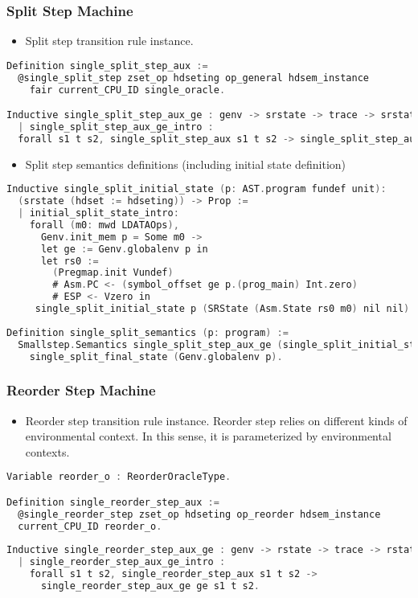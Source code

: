 \subsubsection{Split Step Machine}
\begin{itemize}[leftmargin=*]
\item Split step transition rule instance.
\end{itemize}
\begin{lstlisting}[language=C]
Definition single_split_step_aux :=
  @single_split_step zset_op hdseting op_general hdsem_instance 
    fair current_CPU_ID single_oracle.

Inductive single_split_step_aux_ge : genv -> srstate -> trace -> srstate -> Prop :=
  | single_split_step_aux_ge_intro : 
  forall s1 t s2, single_split_step_aux s1 t s2 -> single_split_step_aux_ge ge s1 t s2.
\end{lstlisting}


\begin{itemize}[leftmargin=*]
\item Split step semantics definitions (including initial state definition)
\end{itemize}
\begin{lstlisting}[language=C]
Inductive single_split_initial_state (p: AST.program fundef unit): 
  (srstate (hdset := hdseting)) -> Prop :=
  | initial_split_state_intro: 
    forall (m0: mwd LDATAOps),
      Genv.init_mem p = Some m0 ->
      let ge := Genv.globalenv p in
      let rs0 :=
        (Pregmap.init Vundef)
        # Asm.PC <- (symbol_offset ge p.(prog_main) Int.zero)
        # ESP <- Vzero in
     single_split_initial_state p (SRState (Asm.State rs0 m0) nil nil).
          
Definition single_split_semantics (p: program) :=
  Smallstep.Semantics single_split_step_aux_ge (single_split_initial_state p) 
    single_split_final_state (Genv.globalenv p).
\end{lstlisting}

\subsubsection{Reorder Step Machine}
\begin{itemize}[leftmargin=*]
\item Reorder step transition rule instance. Reorder step relies on different kinds of environmental context. In this sense, 
it is parameterized by environmental contexts.
\end{itemize}
\begin{lstlisting}[language=C]
Variable reorder_o : ReorderOracleType.

Definition single_reorder_step_aux :=
  @single_reorder_step zset_op hdseting op_reorder hdsem_instance 
  current_CPU_ID reorder_o.
  
Inductive single_reorder_step_aux_ge : genv -> rstate -> trace -> rstate -> Prop :=
  | single_reorder_step_aux_ge_intro : 
    forall s1 t s2, single_reorder_step_aux s1 t s2 -> 
      single_reorder_step_aux_ge ge s1 t s2.  
\end{lstlisting}


